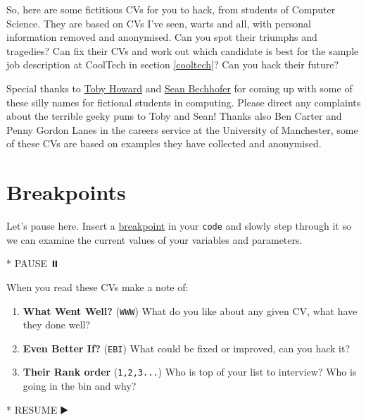 \documentclass[
]{book}
\newenvironment{Shaded}{\begin{snugshade}}{\end{snugshade}}
\newcommand{\NormalTok}[1]{#1}
\newcommand{\SpecialStringTok}[1]{\textcolor[rgb]{0.31,0.60,0.02}{#1}}
\providecommand{\tightlist}{%
  \setlength{\itemsep}{0pt}\setlength{\parskip}{0pt}}
\begin{document}
So, here are some fictitious CVs for you to hack, from students of Computer Science. They are based on CVs I've seen, warts and all, with personal information removed and anonymised. Can you spot their triumphs and tragedies? Can fix their CVs and work out which candidate is best for the sample job description at CoolTech in section \ref{cooltech}? Can you hack their future?

Special thanks to \href{https://en.wikipedia.org/wiki/Toby_Howard}{Toby Howard} and \href{https://personalpages.manchester.ac.uk/staff/sean.bechhofer/}{Sean Bechhofer} for coming up with some of these silly names for fictional students in computing. Please direct any complaints about the terrible geeky puns to Toby and Sean! Thanks also Ben Carter and Penny Gordon Lanes in the careers service at the University of Manchester, some of these CVs are based on examples they have collected and anonymised. 🙏

\hypertarget{breakpoints}{%
\section{Breakpoints}\label{breakpoints}}

Let's pause here. Insert a \href{https://en.wikipedia.org/wiki/Breakpoint}{breakpoint} in your \texttt{code} and slowly step through it so we can examine the current values of your variables and parameters.

\begin{Shaded}
\begin{Highlighting}[]
\SpecialStringTok{* }\NormalTok{PAUSE ⏸️}
\end{Highlighting}
\end{Shaded}

When you read these CVs make a note of:

\begin{enumerate}
\def\labelenumi{\arabic{enumi}.}
\tightlist
\item
  \textbf{What Went Well?} (\texttt{WWW}) What do you like about any given CV, what have they done well?
\item
  \textbf{Even Better If?} (\texttt{EBI}) What could be fixed or improved, can you hack it?
\item
  \textbf{Their Rank order} (\texttt{1,2,3...}) Who is top of your list to interview? Who is going in the bin and why?
\end{enumerate}

\begin{Shaded}
\begin{Highlighting}[]
\SpecialStringTok{* }\NormalTok{RESUME ▶️}
\end{Highlighting}
\end{Shaded}
\end{document}
